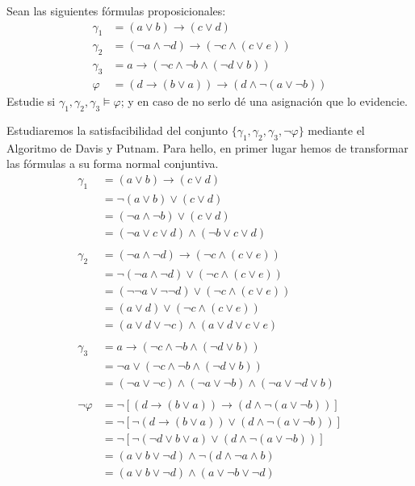 \begin{ejercicio}\label{ej:1.3.4}
    Sean las siguientes fórmulas proposicionales:
    \begin{align*}
        \gamma_1 &= (a\lor b)\rightarrow (c\lor d)\\
        \gamma_2 &= (\lnot a\land \lnot d)\rightarrow (\lnot c\land (c\lor e))\\
        \gamma_3 &= a \rightarrow (\lnot c\land \lnot b \land (\lnot d\lor b))\\
        \varphi &= (d\rightarrow(b\lor a)) \rightarrow (d\land \lnot (a\lor \lnot b))        
    \end{align*}
    Estudie si $\gamma_1,\gamma_2,\gamma_3\models \varphi$; y en caso de no serlo dé una asignación que lo evidencie.

    Estudiaremos la satisfacibilidad del conjunto $\{\gamma_1,\gamma_2,\gamma_3,\lnot \varphi\}$
    mediante el Algoritmo de Davis y Putnam. Para hello, en primer
    lugar hemos de transformar las fórmulas a su forma normal conjuntiva.
    \begin{align*}
        \gamma_1 &= (a\lor b)\rightarrow (c\lor d)\\
        &= \lnot (a\lor b)\lor (c\lor d)\\
        &= (\lnot a\land \lnot b)\lor (c\lor d)\\
        &= (\lnot a\lor c\lor d)\land (\lnot b\lor c\lor d)\\ \\
        \gamma_2 &= (\lnot a\land \lnot d)\rightarrow (\lnot c\land (c\lor e))\\
        &= \lnot (\lnot a\land \lnot d)\lor (\lnot c\land (c\lor e))\\
        &= (\lnot \lnot a \lor \lnot \lnot d)\lor (\lnot c\land (c\lor e))\\
        &= (a\lor d)\lor (\lnot c\land (c\lor e))\\
        &= (a\lor d \lor \lnot c)\land (a\lor d\lor c\lor e)\\ \\
        \gamma_3 &= a \rightarrow (\lnot c\land \lnot b \land (\lnot d\lor b))\\
        &= \lnot a\lor (\lnot c\land \lnot b \land (\lnot d\lor b))\\
        &= (\lnot a\lor \lnot c) \land (\lnot a\lor \lnot b) \land (\lnot a\lor \lnot d\lor b)\\ \\
        \lnot \varphi &= \lnot \left[(d\rightarrow(b\lor a)) \rightarrow (d\land \lnot (a\lor \lnot b))\right]\\
        &= \lnot \left[\lnot (d\rightarrow(b\lor a))\lor (d\land \lnot (a\lor \lnot b))\right]\\
        &= \lnot \left[\lnot (\lnot d\lor b\lor a)\lor (d\land \lnot (a\lor \lnot b))\right]\\
        &= (a\lor b\lor \lnot d)\land \lnot(d\land \lnot a\land b)\\
        &= (a\lor b\lor \lnot d)\land (a \lor \lnot b\lor \lnot d)
    \end{align*}


\end{ejercicio}
